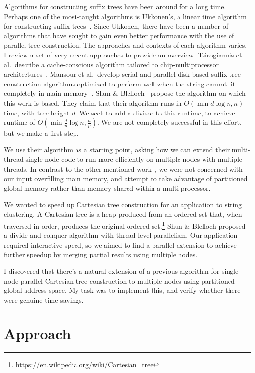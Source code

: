 \documentclass[10pt]{article}
\begin{document}
Algorithms for constructing suffix trees have been around for a long time.
Perhaps one of the most-taught algorithms is Ukkonen's, a linear time algorithm for constructing
suffix trees~\cite{ukkonen_online_1995}.
Since Ukkonen, there have been a number of algorithms that have sought to gain even better
performance with the use of parallel tree construction.
The approaches and contexts of each algorithm varies.
I review a set of very recent approaches to provide an overview.
Tsirogiannis et al.\ describe a cache-conscious algorithm tailored to chip-multiprocessor
architectures~\cite{tsirogiannis_suffix_2010}.
Mansour et al.\ develop serial and parallel disk-based suffix tree construction algorithms
optimized to perform well when the string cannot fit completely in main memory~\cite{mansour_era_2011}.
Shun \& Blelloch~\cite{shun_simple_2014} propose the algorithm on which this work is based.
They claim that their algorithm runs in $O\left(\min{d \log n, n}\right)$ time, 
with tree height $d$.
We seek to add a divisor to this runtime, to achieve runtime of
$O\left(\min{\frac{d}{p} \log n, \frac{n}{p}}\right)$.
We are not completely successful in this effort, but we make a first step.

We use their algorithm as a starting point, asking how we can extend their multi-thread single-node
code to run more efficiently on multiple nodes with multiple threads.
In contrast to the other mentioned work~\cite{tsirogiannis_suffix_2010,mansour_era_2011}, we were
not concerned with our input overfilling main memory, and attempt to take advantage of partitioned
global memory rather than memory shared within a multi-processor.

We wanted to speed up Cartesian tree construction for an application to string clustering.
A Cartesian tree is a heap produced from an ordered set that, when traversed in order, produces the original ordered set.\footnote{\url{https://en.wikipedia.org/wiki/Cartesian_tree}}
Shun \& Blelloch proposed a divide-and-conquer algorithm with thread-level parallelism.
Our application required interactive speed, so we aimed to find a parallel extension to achieve further speedup by merging partial results using multiple nodes.

I discovered that there's a natural extension of a previous algorithm for single-node parallel Cartesian tree construction to multiple nodes using partitioned global address space.
My task was to implement this, and verify whether there were genuine time savings.
\fi

\section{Approach}
\end{document}
